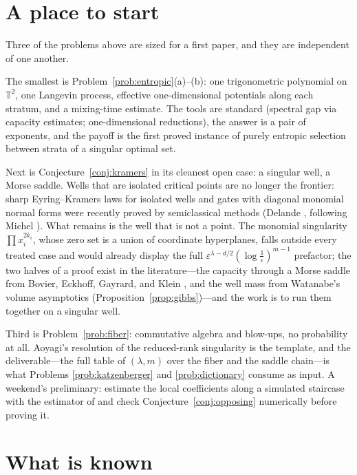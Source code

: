 \documentclass[11pt]{amsart}
\theoremstyle{plain}
\theoremstyle{definition}
\newcommand{\T}{\mathbb{T}}
\begin{document}
\section{A place to start}\label{sec:start}

Three of the problems above are sized for a first paper, and they are independent of one another.

The smallest is Problem~\ref{prob:entropic}(a)--(b): one trigonometric polynomial on $\T^2$, one Langevin process, effective one-dimensional potentials along each stratum, and a mixing-time estimate. The tools are standard (spectral gap via capacity estimates; one-dimensional reductions), the answer is a pair of exponents, and the payoff is the first proved instance of purely entropic selection between strata of a singular optimal set.

Next is Conjecture~\ref{conj:kramers} in its cleanest open case: a singular well, a Morse saddle. Wells that are isolated critical points are no longer the frontier: sharp Eyring--Kramers laws for isolated wells and gates with diagonal monomial normal forms were recently proved by semiclassical methods (Delande \cite{delande2024}, following Michel \cite{michel2019}). What remains is the well that is not a point. The monomial singularity $\prod x_i^{2k_i}$, whose zero set is a union of coordinate hyperplanes, falls outside every treated case and would already display the full $\varepsilon^{\lambda - d/2} (\log \tfrac1\varepsilon)^{m-1}$ prefactor; the two halves of a proof exist in the literature---the capacity through a Morse saddle from Bovier, Eckhoff, Gayrard, and Klein \cite{begk2004}, and the well mass from Watanabe's volume asymptotics (Proposition~\ref{prop:gibbs})---and the work is to run them together on a singular well.

Third is Problem~\ref{prob:fiber}: commutative algebra and blow-ups, no probability at all. Aoyagi's resolution of the reduced-rank singularity is the template, and the deliverable---the full table of $(\lambda, m)$ over the fiber and the saddle chain---is what Problems \ref{prob:katzenberger} and \ref{prob:dictionary} consume as input. A weekend's preliminary: estimate the local coefficients along a simulated staircase with the estimator of \cite{lau2023} and check Conjecture~\ref{conj:opposing} numerically before proving it.

\section{What is known}\label{sec:known}
\end{document}
